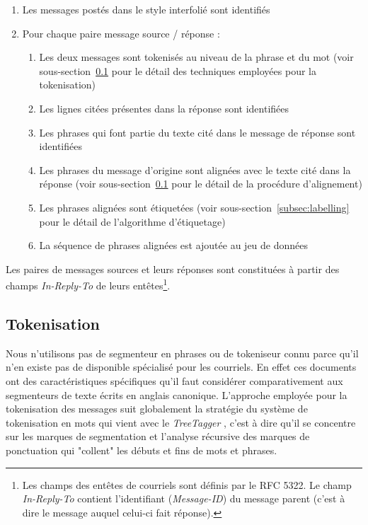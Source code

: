 \begin{enumerate}
    \item Les messages postés dans le style interfolié sont identifiés
    \item Pour chaque paire message source / réponse :
    \begin{enumerate}
        \item Les deux messages sont tokenisés au niveau de la phrase et du mot (voir sous-section~\ref{subsec:tokenization} pour le détail des techniques employées pour la tokenisation)
        \item Les lignes citées présentes dans la réponse sont identifiées
        \item Les phrases qui font partie du texte cité dans le message de réponse sont identifiées
        \item Les phrases du message d'origine sont alignées avec le texte cité dans la réponse (voir sous-section~\ref{subsec:tokenization} pour le détail de la procédure d'alignement)
        \item Les phrases alignées sont étiquetées (voir sous-section~\ref{subsec:labelling} pour le détail de l'algorithme d'étiquetage)
        \item La séquence de phrases alignées est ajoutée au jeu de données
    \end{enumerate}
\end{enumerate}

Les paires de messages sources et leurs réponses sont constituées à partir des champs \emph{In-Reply-To} de leurs entêtes\footnote{Les champs des entêtes de courriels sont définis par le RFC 5322. Le champ \emph{In-Reply-To} contient l'identifiant (\emph{Message-ID}) du message parent (c'est à dire le message auquel celui-ci fait réponse).}.


\subsection{Tokenisation}

\label{subsec:tokenization}

Nous n'utilisons pas de segmenteur en phrases ou de tokeniseur connu parce qu'il n'en existe pas de disponible spécialisé pour les courriels. En effet ces documents ont des caractéristiques spécifiques qu'il faut considérer comparativement aux segmenteurs de texte écrits en anglais canonique. L'approche employée pour la tokenisation des messages suit globalement la stratégie du système de tokenisation en mots qui vient avec le \textit{TreeTagger} \cite{schmid:94b}, c'est à dire qu'il se concentre sur les marques de segmentation et l'analyse récursive des marques de ponctuation qui "collent" les débuts et fins de mots et phrases.

